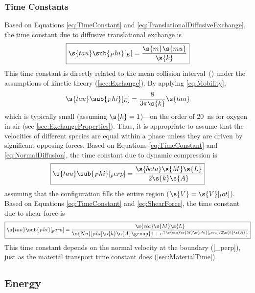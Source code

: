 \subsubsection{Time Constants}
\label{sec:TranslationalTime}

Based on Equations \ref{eq:TimeConstant} and \ref{eq:TranslationalDiffusiveExchange}, the time constant due to diffusive translational exchange is
\begin{equation}
  \boxed{\s{tau}\sub{_Phi}[_E] = \frac{\s{m}\s{mu}}{\s{k}}}
\end{equation}
This time constant is directly related to the mean collision interval~() under the assumptions of kinetic theory (\autoref{sec:Exchange}).  By applying \autoref{eq:Mobility},
\begin{equation}
  \s{tau}\sub{_Phi}[_E] = \frac{8}{3\pi\s{k}}\s{tau}
\end{equation}
which is typically small (assuming $\s{k} = 1$)---on the order of \SI{20}{ns} for oxygen in air (see \autoref{sec:ExchangeProperties}).  Thus, it is appropriate to assume that the velocities of different species are equal within a phase unless they are driven by significant opposing forces.  Based on Equations \ref{eq:TimeConstant} and \ref{eq:NormalDiffusion}, the time constant due to dynamic compression is
\begin{equation}
  \boxed{\s{tau}\sub{_Phi}[_perp] = \frac{\s{beta}\s{M}\s{L}}{2\s{k}\s{A}}}
\end{equation}
assuming that the configuration fills the entire region ($\s{V} = \s{V}[_tot]$).  Based on Equations \ref{eq:TimeConstant} and \ref{eq:ShearForce}, the time constant due to shear force is
\begin{equation}
  \boxed{\s{tau}\sub{_Phi}[_para] = \frac{\s{eta}\s{M}\s{L}}{\s{Nu}[_Phi]\s{k}\s{A}\group{1 + e^{\mp\s{eta}\s{M}\s{phi}[_perp]/2\s{k}\s{A}}}}}
\end{equation}
This time constant depends on the normal velocity at the boundary ([_perp]), just as the material transport time constant does (\autoref{sec:MaterialTime}).


\subsection{Energy}
\label{sec:EnergyBalance}

